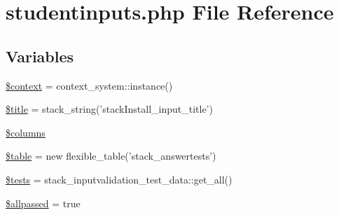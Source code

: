 \hypertarget{studentinputs_8php}{
\section{studentinputs.php File Reference}
\label{studentinputs_8php}
}
\subsection*{Variables}
\begin{DoxyCompactItemize}
\item 
\hyperlink{studentinputs_8php_ae05dedb802ada0155efdece2044fed64}{\$context} = context\_\-system::instance()
\item 
\hyperlink{studentinputs_8php_ada57e7bb7c152edad18fe2f166188691}{\$title} = stack\_\-string('stackInstall\_\-input\_\-title')
\item 
\hyperlink{studentinputs_8php_a19d2a3d21fe02053311fde465e6ae2e9}{\$columns}
\item 
\hyperlink{studentinputs_8php_ae8876a14058f368335baccf35af4a22b}{\$table} = new flexible\_\-table('stack\_\-answertests')
\item 
\hyperlink{studentinputs_8php_a6d7f4b753e7eb18b328a7eeba5e0094f}{\$tests} = stack\_\-inputvalidation\_\-test\_\-data::get\_\-all()
\item 
\hyperlink{studentinputs_8php_ab5a10be91c162cb48ac439a779b80046}{\$allpassed} = true
\end{DoxyCompactItemize}


